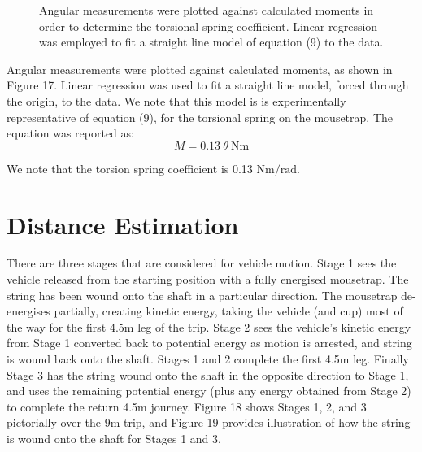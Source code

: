 \documentclass[a4paper]{article}
\begin{document}
\begin{figure}[h]
	\centering
	\caption{Angular measurements were plotted against calculated moments in order to determine the torsional spring coefficient. Linear regression was employed to fit a straight line model of equation (9) to the data.}
\end{figure}

Angular measurements were plotted against calculated moments, as shown in Figure 17. Linear regression was used to fit a straight line model, forced through the origin, to the data. We note that this model is is experimentally representative of equation (9), for the torsional spring on the mousetrap. The equation was reported as:
\begin{equation}
	M = 0.13 \ \theta \ \si{\newton\meter}
\end{equation}

We note that the torsion spring coefficient is 0.13 $\si{\newton\meter\per\radian}$.

\section{Distance Estimation}
There are three stages that are considered for vehicle motion. Stage 1 sees the vehicle released from the starting position with a fully energised mousetrap. The string has been wound onto the shaft in a particular direction. The mousetrap de-energises partially, creating kinetic energy, taking the vehicle (and cup) most of the way for the first 4.5$\si{\meter}$ leg of the trip. Stage 2 sees the vehicle's kinetic energy from Stage 1 converted back to potential energy as motion is arrested, and string is wound back onto the shaft. Stages 1 and 2 complete the first 4.5$\si{\meter}$ leg. Finally Stage 3 has the string wound onto the shaft in the opposite direction to Stage 1, and uses the remaining potential energy (plus any energy obtained from Stage 2) to complete the return 4.5m journey. Figure 18 shows Stages 1, 2, and 3 pictorially over the 9m trip, and Figure 19 provides illustration of how the string is wound onto the shaft for Stages 1 and 3.
\end{document}
